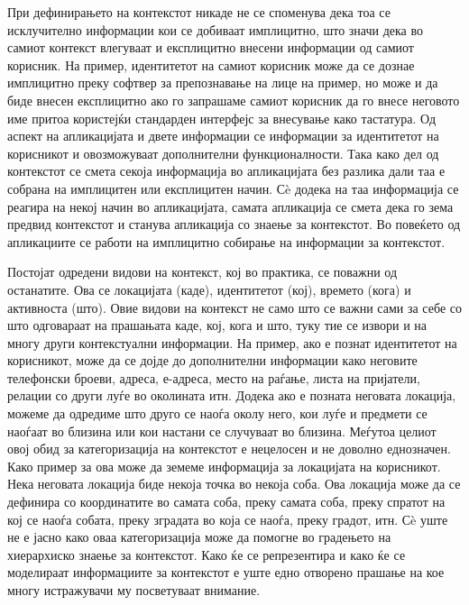 При дефинирањето на контекстот никаде не се споменува дека тоа се исклучително
информации кои се добиваат имплицитно, што значи дека во самиот контекст
влегуваат и експлицитно внесени информации од самиот корисник. На пример,
идентитетот на самиот корисник може да се дознае имплицитно преку софтвер за
препознавање на лице на пример, но може и да биде внесен експлицитно ако го
запрашаме самиот корисник да го внесе неговото име притоа користејќи стандарден
интерфејс за внесување како тастатура. Од аспект на апликацијата и двете
информации се информации за идентитетот на корисникот и овозможуваат
дополнителни функционалности. Така како дел од контекстот се смета секоја
информација во апликацијата без разлика дали таа е собрана на имплицитен или
експлицитен начин. Сè додека на таа информација се реагира на некој начин во
апликацијата, самата апликација се смета дека го зема предвид контекстот и
станува апликација со знаење за контекстот. Во повеќето од апликациите се работи
на имплицитно собирање на информации за контекстот.

Постојат одредени видови на контекст, кој во практика, се поважни од останатите.
Ова се локацијата (каде), идентитетот (кој), времето (кога) и активноста (што).
Овие видови на контекст не само што се важни сами за себе со што одговараат на
прашањата каде, кој, кога и што, туку тие се извори и на многу други
контекстуални информации. На пример, ако е познат идентитетот на корисникот,
може да се дојде до дополнителни информации како неговите телефонски броеви,
адреса, е-адреса, место на раѓање, листа на пријатели, релации со други луѓе во
околината итн. Додека ако е позната неговата локација, можеме да одредиме што
друго се наоѓа околу него, кои луѓе и предмети се наоѓаат во близина или кои
настани се случуваат во близина. Меѓутоа целиот овој обид за категоризација на
контекстот е нецелосен и не доволно еднозначен. Како пример за ова може да
земеме информација за локацијата на корисникот. Нека неговата локација биде
некоја точка во некоја соба. Ова локација може да се дефинира со координатите во
самата соба, преку самата соба, преку спратот на кој се наоѓа собата, преку
зградата во која се наоѓа, преку градот, итн. Сè уште не е јасно како оваа
категоризација може да помогне во градењето на хиерархиско знаење за контекстот.
Како ќе се репрезентира и како ќе се моделираат информациите за контекстот е
уште едно отворено прашање на кое многу истражувачи му посветуваат внимание.

